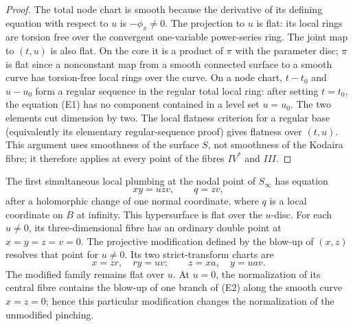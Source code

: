 \begin{proof}
The total node chart is smooth because the derivative of its defining
equation with respect to $u$ is $-\phi_x\ne0$. The projection to $u$
is flat: its local rings are torsion free over the convergent
one-variable power-series ring. The joint map to $(t,u)$ is also
flat. On the core it is a product of $\pi$ with the parameter disc;
$\pi$ is flat since a nonconstant map from a smooth connected surface
to a smooth curve has torsion-free local rings over the curve. On a
node chart, $t-t_0$ and $u-u_0$ form a regular sequence in the regular
total local ring: after setting $t=t_0$, the equation (E1) has no
component contained in a level set $u=u_0$. The two elements cut
dimension by two. The local flatness criterion for a regular base
(equivalently its elementary regular-sequence proof) gives flatness
over $(t,u)$. This argument uses smoothness of the surface $S$, not
smoothness of the Kodaira fibre; it therefore applies at every point
of the fibres $IV^*$ and $III$.
\end{proof}

\begin{proposition}[E.1.3; Proved]\label{st:E.1.3}
The first simultaneous local plumbing at the nodal point of $S_\infty$
has equation
\[
                 xy=u zv,\qquad q=zv,                         \tag{E2}
\]
after a holomorphic change of one normal coordinate, where $q$ is a
local coordinate on $B$ at infinity. This hypersurface is flat over
the $u$-disc. For each $u\ne0$, its three-dimensional fibre has an
ordinary double point at $x=y=z=v=0$. The projective modification
defined by the blow-up of $(x,z)$ resolves that point for $u\ne0$.
Its two strict-transform charts are
\[
       x=zr,\quad ry=uv;
       \qquad z=xa,\quad y=uav.                               \tag{E3}
\]
The modified family remains flat over $u$. At $u=0$, the normalization
of its central fibre contains the blow-up of one branch of (E2) along
the smooth curve $x=z=0$; hence this particular modification changes
the normalization of the unmodified pinching.
\end{proposition}

